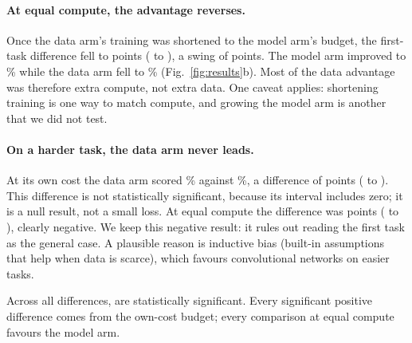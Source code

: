 \documentclass[pdflatex,sn-mathphys-num]{sn-jnl}
\begin{document}
\paragraph{At equal compute, the advantage reverses.} Once the data arm's training was
shortened to the model arm's budget, the first-task difference fell to \dFirstEqc{} points
(\loFirstEqc{} to \hiFirstEqc{}), a swing of \swingFirst{} points. The model arm improved
to \accModelFirstEqc{}\% while the data arm fell to \accDataFirstEqc{}\%
(Fig.~\ref{fig:results}b). Most of the data advantage was therefore extra compute, not
extra data. One caveat applies: shortening training is one way to match compute, and
growing the model arm is another that we did not test.

\paragraph{On a harder task, the data arm never leads.} At its own cost the data arm scored
\accDataHardOwn{}\% against \accModelHardOwn{}\%, a difference of \dHardOwn{} points
(\loHardOwn{} to \hiHardOwn{}). This difference is not statistically significant, because
its interval includes zero; it is a null result, not a small loss. At equal compute the
difference was \dHardEqc{} points (\loHardEqc{} to \hiHardEqc{}), clearly negative. We keep
this negative result: it rules out reading the first task as the general case. A plausible
reason is inductive bias (built-in assumptions that help when data is scarce), which
favours convolutional networks on easier tasks.

Across all \nCompared{} differences, \nSig{} are statistically significant. Every significant
positive difference comes from the own-cost budget; every comparison at equal compute
favours the model arm.
\end{document}
